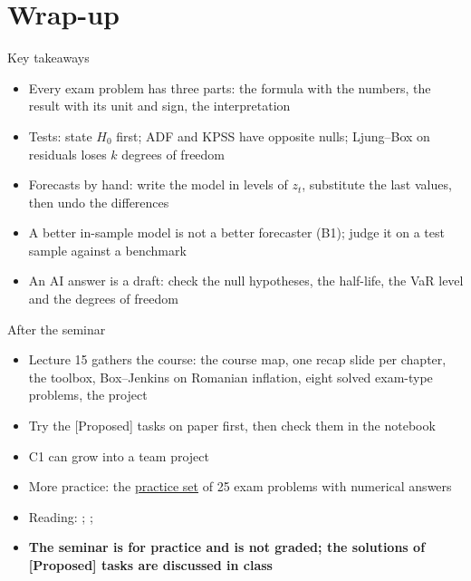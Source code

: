 \section{Wrap-up}

\begin{frame}{Key takeaways}
\itemsize{\small}
\begin{itemize}
    \item Every exam problem has three parts: the formula with the numbers, the result with its unit and sign, the interpretation
    \item Tests: state $H_0$ first; ADF and KPSS have opposite nulls; Ljung--Box on residuals loses $k$ degrees of freedom
    \item Forecasts by hand: write the model in levels of $z_t$, substitute the last values, then undo the differences
    \item A better in-sample model is not a better forecaster (B1); judge it on a test sample against a benchmark
    \item An AI answer is a draft: check the null hypotheses, the half-life, the VaR level and the degrees of freedom
\end{itemize}
\end{frame}

\begin{frame}{After the seminar}
\itemsize{\small}
\begin{itemize}
    \item Lecture 15 gathers the course: the course map, one recap slide per chapter, the toolbox, Box--Jenkins on Romanian inflation, eight solved exam-type problems, the project
    \item Try the [Proposed] tasks on paper first, then check them in the notebook
    \item C1 can grow into a team project
    \item More practice: the \href{https://danpele.github.io/Time-Series-Analysis/exam/practice/exam_problems_en.pdf}{practice set} of 25 exam problems with numerical answers
    \item Reading: ; ; 
    \item \textbf{The seminar is for practice and is not graded; the solutions of [Proposed] tasks are discussed in class}
\end{itemize}
\end{frame}



